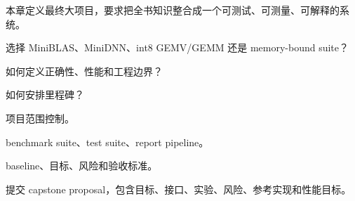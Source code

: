 {本章定义最终大项目，要求把全书知识整合成一个可测试、可测量、可解释的系统。}
{\item 选择 MiniBLAS、MiniDNN、int8 GEMV/GEMM 还是 memory-bound suite？
\item 如何定义正确性、性能和工程边界？
\item 如何安排里程碑？}
{\item 项目范围控制。
\item benchmark suite、test suite、report pipeline。
\item baseline、目标、风险和验收标准。}
{提交 capstone proposal，包含目标、接口、实验、风险、参考实现和性能目标。}
